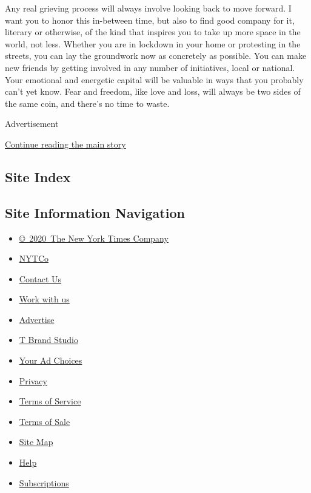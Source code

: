 Any real grieving process will always involve looking back to move
forward. I want you to honor this in-between time, but also to find good
company for it, literary or otherwise, of the kind that inspires you to
take up more space in the world, not less. Whether you are in lockdown
in your home or protesting in the streets, you can lay the groundwork
now as concretely as possible. You can make new friends by getting
involved in any number of initiatives, local or national. Your emotional
and energetic capital will be valuable in ways that you probably can't
yet know. Fear and freedom, like love and loss, will always be two sides
of the same coin, and there's no time to waste.

Advertisement

\protect\hyperlink{after-bottom}{Continue reading the main story}

\hypertarget{site-index}{%
\subsection{Site Index}\label{site-index}}

\hypertarget{site-information-navigation}{%
\subsection{Site Information
Navigation}\label{site-information-navigation}}

\begin{itemize}
\tightlist
\item
  \href{https://help.nytimes.com/hc/en-us/articles/115014792127-Copyright-notice}{©~2020~The
  New York Times Company}
\end{itemize}

\begin{itemize}
\tightlist
\item
  \href{https://www.nytco.com/}{NYTCo}
\item
  \href{https://help.nytimes.com/hc/en-us/articles/115015385887-Contact-Us}{Contact
  Us}
\item
  \href{https://www.nytco.com/careers/}{Work with us}
\item
  \href{https://nytmediakit.com/}{Advertise}
\item
  \href{http://www.tbrandstudio.com/}{T Brand Studio}
\item
  \href{https://www.nytimes.com/privacy/cookie-policy\#how-do-i-manage-trackers}{Your
  Ad Choices}
\item
  \href{https://www.nytimes.com/privacy}{Privacy}
\item
  \href{https://help.nytimes.com/hc/en-us/articles/115014893428-Terms-of-service}{Terms
  of Service}
\item
  \href{https://help.nytimes.com/hc/en-us/articles/115014893968-Terms-of-sale}{Terms
  of Sale}
\item
  \href{https://spiderbites.nytimes.com}{Site Map}
\item
  \href{https://help.nytimes.com/hc/en-us}{Help}
\item
  \href{https://www.nytimes.com/subscription?campaignId=37WXW}{Subscriptions}
\end{itemize}
